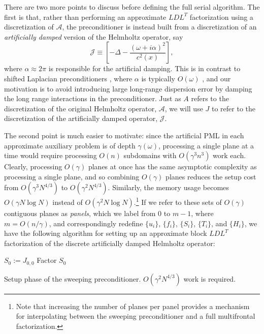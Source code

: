 There are two more points to discuss before defining the full serial algorithm. 
The first is that, rather than performing an approximate $LDL^T$ factorization 
using a discretization of $\mathcal{A}$, the preconditioner is instead built 
from a discretization of an {\em artificially damped} version of the Helmholtz 
operator, say
\begin{equation}\label{artificial-helmholtz}
  \mathcal{J} \equiv 
  \left[-\Delta - \frac{(\omega+i\alpha)^2}{c^2(x)}\right],
\end{equation}
where $\alpha \approx 2 \pi$ is responsible for the artificial damping. This 
is in contrast to shifted Laplacian preconditioners 
\cite{BaylissGoldsteinTurkel-shifted,ErlanggaVuikOosterlee-class}, where 
$\alpha$ is typically $O(\omega)$ \cite{ErnstGander-classical}, and our 
motivation is to avoid introducing large long-range dispersion error by 
damping the long range interactions in the preconditioner. Just as $A$ 
refers to the discretization of the original Helmholtz operator, $\mathcal{A}$,
we will use $J$ to refer to the discretization of the artificially damped 
operator,
$\mathcal{J}$.

The second point is much easier to motivate: since the artificial PML in 
each approximate auxiliary problem is of depth $\gamma(\omega)$, processing 
a single plane at a time would require processing $O(n)$ subdomains with 
$O(\gamma^3 n^3)$ work each. Clearly, processing $O(\gamma)$ planes at once
has the same asymptotic complexity as processing a single plane, and so 
combining $O(\gamma)$ planes reduces the setup cost from $O(\gamma^3 N^{4/3})$ 
to $O(\gamma^2 N^{4/3})$.
Similarly, the memory usage becomes $O(\gamma N \log N)$ instead of 
$O(\gamma^2 N \log N)$.\footnote{Note that increasing the number of planes 
per panel provides a mechanism for interpolating between the sweeping 
preconditioner and a full multifrontal factorization.} If we refer to these 
sets of $O(\gamma)$ contiguous planes as {\em panels}, which we label from 
$0$ to $m-1$, where $m=O(n/\gamma)$, and correspondingly redefine 
$\{u_i\}$, $\{f_i\}$, $\{S_i\}$, $\{T_i\}$, and $\{H_i\}$, 
we have the following algorithm for setting up an approximate 
block $LDL^T$ factorization of the discrete artificially damped Helmholtz 
operator:

\begin{algorithm2e}
\DontPrintSemicolon
$S_0 := J_{0,0}$\;
Factor $S_0$\;
\caption{Setup phase of the sweeping preconditioner. 
$O(\gamma^2 N^{4/3})$ work is required.}
\label{alg:sweeping-setup}
\end{algorithm2e}

